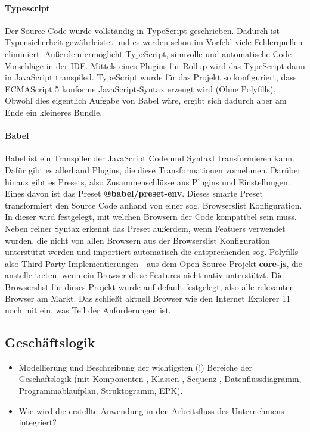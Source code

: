 
\paragraph{Typescript} Der Source Code wurde vollständig in TypeScript geschrieben. Dadurch ist Typensicherheit gewährleistet und es werden schon im Vorfeld viele Fehlerquellen eliminiert. Außerdem ermöglicht TypeScript, sinnvolle und automatische Code-Vorschläge in der IDE. 
Mittels eines Plugins für Rollup wird das TypeScript dann in JavaScript transpiled. TypeScript wurde für das Projekt so konfiguriert, dass ECMAScript 5 konforme JavaScript-Syntax erzeugt wird (Ohne Polyfills). Obwohl dies eigentlich Aufgabe von Babel wäre, ergibt sich dadurch aber am Ende ein kleineres Bundle.

\paragraph{Babel} Babel ist ein Transpiler der JavaScript Code und Syntaxt transformieren kann. Dafür gibt es allerhand Plugins, die diese Transformationen vornehmen. Darüber hinaus gibt es Presets, also Zusammenschlüsse aus Plugins und Einstellungen. Eines davon ist das Preset \textbf{@babel/preset-env}. Dieses smarte Preset transformiert den Source Code anhand von einer sog. Browserslist Konfiguration. In dieser wird festgelegt, mit welchen Browsern der Code kompatibel sein muss. Neben reiner Syntax erkennt das Preset außerdem, wenn Featuers verwendet wurden, die nicht von allen Browsern aus der Browserslist Konfiguration unterstützt werden und importiert automatisch die entsprechenden sog. Polyfills - also Third-Party Implementierungen - aus dem Open Source Projekt \textbf{core-js}, die anstelle treten, wenn ein Browser diese Features nicht nativ unterstützt. Die Browserslist für dieses Projekt wurde auf default festgelegt, also alle relevanten Browser am Markt. Das schließt aktuell Browser wie den Internet Explorer 11 noch mit ein, was Teil der Anforderungen ist.



\subsection{Geschäftslogik}
\label{sec:Geschaeftslogik}

\begin{itemize}
	\item Modellierung und Beschreibung der wichtigsten (!) Bereiche der Geschäftslogik (\zB mit Kom\-po\-nen\-ten-, Klassen-, Sequenz-, Datenflussdiagramm, Programmablaufplan, Struktogramm, \ac{EPK}).
	\item Wie wird die erstellte Anwendung in den Arbeitsfluss des Unternehmens integriert?
\end{itemize}

